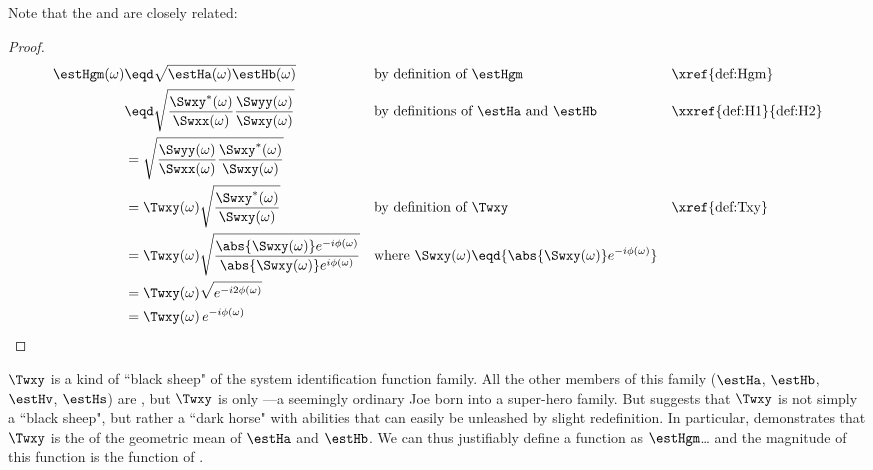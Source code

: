 \begin{remark}
\label{rem:HgmTxy_mag}
Note that the   and  
are closely related:
\end{remark}
\begin{proof}
\begin{align*}
  \estHgm(\omega) 
    &\eqd \sqrt{\estHa(\omega)\estHb(\omega)}
    && \text{by definition of $\estHgm$}
    && \text{\xref{def:Hgm}}
  \\&\eqd \sqrt{\frac{\Swxy^\ast(\omega)}{\Swxx(\omega)}\frac{\Swyy(\omega)}{\Swxy(\omega)}}
    && \text{by definitions of $\estHa$ and $\estHb$}
    && \text{\xxref{def:H1}{def:H2}}
  \\&= \sqrt{\frac{\Swyy(\omega)}{\Swxx(\omega)}\frac{\Swxy^\ast(\omega)}{\Swxy(\omega)}}
  \\&= \Twxy(\omega)\sqrt{\frac{\Swxy^\ast(\omega)}{\Swxy(\omega)}}
    && \text{by definition of $\Twxy$}
    && \text{\xref{def:Txy}}
  \\&= \Twxy(\omega)\sqrt{\frac{\abs{\Swxy(\omega)}e^{-i\phi(\omega)}}{\abs{\Swxy(\omega)}e^{i\phi(\omega)}}}
    && \text{where $\Swxy(\omega)\eqd{\abs{\Swxy(\omega)}e^{-i\phi(\omega)}}$}
  \\&= \Twxy(\omega)\sqrt{e^{-i2\phi(\omega)}}
  \\&= \Twxy(\omega)\,e^{-i\phi(\omega)}
\end{align*}
\end{proof}

\begin{remark}
\label{rem:HgmTxy_gen}
 $\Twxy$ is a kind of ``black sheep" of the system identification function family. 
All the other members of this family ($\estHa$, $\estHb$, $\estHv$, $\estHs$) are ,
but $\Twxy$ is only ---a seemingly ordinary Joe born into a super-hero family.
But  suggests that $\Twxy$ is not simply a ``black sheep", but 
rather a ``dark horse" with abilities that can easily be unleashed by slight redefinition. 
In particular,  demonstrates that $\Twxy$ is the  of the geometric mean of 
$\estHa$ and $\estHb$.
We can thus justifiably define a  function as $\estHgm$\ldots
and the magnitude of this  function is the 
function of .
\end{remark}

